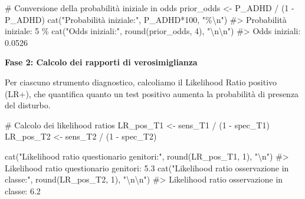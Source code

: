 \documentclass[
  letterpaper,
  DIV=11,
  numbers=noendperiod,
  oneside]{scrreprt}
\newenvironment{Shaded}{\begin{snugshade}}{\end{snugshade}}
\newcommand{\CommentTok}[1]{\textcolor[rgb]{0.37,0.37,0.37}{#1}}
\newcommand{\DecValTok}[1]{\textcolor[rgb]{0.68,0.00,0.00}{#1}}
\newcommand{\FunctionTok}[1]{\textcolor[rgb]{0.28,0.35,0.67}{#1}}
\newcommand{\NormalTok}[1]{\textcolor[rgb]{0.00,0.23,0.31}{#1}}
\newcommand{\OtherTok}[1]{\textcolor[rgb]{0.00,0.23,0.31}{#1}}
\newcommand{\SpecialCharTok}[1]{\textcolor[rgb]{0.37,0.37,0.37}{#1}}
\newcommand{\StringTok}[1]{\textcolor[rgb]{0.13,0.47,0.30}{#1}}
\theoremstyle{definition}
\theoremstyle{plain}
\theoremstyle{definition}
\theoremstyle{remark}
\begin{document}
\begin{tcolorbox}
\begin{Shaded}
\begin{Highlighting}[]
\CommentTok{\# Conversione della probabilità iniziale in odds}
\NormalTok{prior\_odds }\OtherTok{\textless{}{-}}\NormalTok{ P\_ADHD }\SpecialCharTok{/}\NormalTok{ (}\DecValTok{1} \SpecialCharTok{{-}}\NormalTok{ P\_ADHD)}
\FunctionTok{cat}\NormalTok{(}\StringTok{"Probabilità iniziale:"}\NormalTok{, P\_ADHD}\SpecialCharTok{*}\DecValTok{100}\NormalTok{, }\StringTok{"\%}\SpecialCharTok{\textbackslash{}n}\StringTok{"}\NormalTok{)}
\CommentTok{\#\textgreater{} Probabilità iniziale: 5 \%}
\FunctionTok{cat}\NormalTok{(}\StringTok{"Odds iniziali:"}\NormalTok{, }\FunctionTok{round}\NormalTok{(prior\_odds, }\DecValTok{4}\NormalTok{), }\StringTok{"}\SpecialCharTok{\textbackslash{}n\textbackslash{}n}\StringTok{"}\NormalTok{)}
\CommentTok{\#\textgreater{} Odds iniziali: 0.0526}
\end{Highlighting}
\end{Shaded}

\textbf{Fase 2: Calcolo dei rapporti di verosimiglianza}

Per ciascuno strumento diagnostico, calcoliamo il Likelihood Ratio
positivo (LR+), che quantifica quanto un test positivo aumenta la
probabilità di presenza del disturbo.

\begin{Shaded}
\begin{Highlighting}[]
\CommentTok{\# Calcolo dei likelihood ratios}
\NormalTok{LR\_pos\_T1 }\OtherTok{\textless{}{-}}\NormalTok{ sens\_T1 }\SpecialCharTok{/}\NormalTok{ (}\DecValTok{1} \SpecialCharTok{{-}}\NormalTok{ spec\_T1)}
\NormalTok{LR\_pos\_T2 }\OtherTok{\textless{}{-}}\NormalTok{ sens\_T2 }\SpecialCharTok{/}\NormalTok{ (}\DecValTok{1} \SpecialCharTok{{-}}\NormalTok{ spec\_T2)}

\FunctionTok{cat}\NormalTok{(}\StringTok{"Likelihood ratio questionario genitori:"}\NormalTok{, }\FunctionTok{round}\NormalTok{(LR\_pos\_T1, }\DecValTok{1}\NormalTok{), }\StringTok{"}\SpecialCharTok{\textbackslash{}n}\StringTok{"}\NormalTok{)}
\CommentTok{\#\textgreater{} Likelihood ratio questionario genitori: 5.3}
\FunctionTok{cat}\NormalTok{(}\StringTok{"Likelihood ratio osservazione in classe:"}\NormalTok{, }\FunctionTok{round}\NormalTok{(LR\_pos\_T2, }\DecValTok{1}\NormalTok{), }\StringTok{"}\SpecialCharTok{\textbackslash{}n\textbackslash{}n}\StringTok{"}\NormalTok{)}
\CommentTok{\#\textgreater{} Likelihood ratio osservazione in classe: 6.2}
\end{Highlighting}
\end{Shaded}


\end{tcolorbox}
\end{document}
